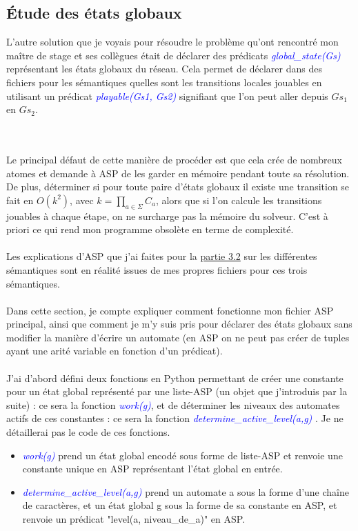 \documentclass[10pt,a4paper]{article}
\begin{document}
\subsection{\'Etude des états globaux}
\hypertarget{partie4.4}{
L'autre solution que je voyais pour résoudre le problème qu'ont rencontré mon maître de stage et ses collègues était de déclarer des prédicats \emph{\textcolor{blue}{global\_state(Gs)}} représentant les états globaux du réseau. 
Cela permet de déclarer dans des fichiers pour les sémantiques quelles sont les transitions locales jouables en utilisant un prédicat \emph{\textcolor{blue}{playable(Gs1, Gs2)}} signifiant que l'on peut aller depuis 
$Gs_1$ en $Gs_2$.}\\ \\
Le principal défaut de cette manière de procéder est que cela crée de nombreux atomes et demande à ASP de les garder en mémoire pendant toute sa résolution. De plus, déterminer si pour toute paire d'états globaux il existe une 
transition se fait en $O(k^2)$, avec $k=\displaystyle{\prod_{a\in\Sigma}C_a}$, alors que si l'on calcule les transitions jouables à chaque étape, on ne surcharge pas la mémoire du solveur. C'est à priori ce qui rend mon programme 
obsolète en terme de complexité.\\ \\
Les explications d'ASP que j'ai faites pour la \hyperlink{semantiques}{partie 3.2} sur les différentes sémantiques sont en réalité issues de mes propres fichiers pour ces trois sémantiques.\\ \\
Dans cette section, je compte expliquer comment fonctionne mon fichier ASP principal, ainsi que comment je m'y suis pris pour déclarer des états globaux sans modifier la manière d'écrire un automate (en ASP on ne peut pas créer 
de tuples ayant une arité variable en fonction d'un prédicat).\\ \\
J'ai d'abord défini deux fonctions en Python permettant de créer une constante pour un état global représenté par une liste-ASP (un objet que j'introduis par la suite) : ce sera la fonction \emph{\textcolor{blue}{work(g)}}, et de 
déterminer les niveaux des automates actifs de ces constantes : ce sera la fonction \emph{\textcolor{blue}{determine\_active\_level(a,g)}} . Je ne détaillerai pas le code de ces fonctions.\\
\begin{itemize}
	\item\emph{\textcolor{blue}{work(g)}} prend un état global encodé sous forme de liste-ASP et renvoie une constante unique en ASP représentant l'état global en entrée.\\
	\item\emph{\textcolor{blue}{determine\_active\_level(a,g)}} prend un automate a sous la forme d'une chaîne de caractères, et un état global g sous la forme de sa constante en ASP, et renvoie un prédicat "level(a, 	
	niveau\_de\_a)" en ASP.
\end{itemize}
\end{document}
